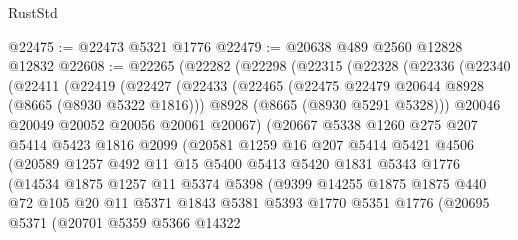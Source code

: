 \begin{lexlean}{RustStd}
\begin{coremodule}
@22475 := @22473 @5321 @1776
@22479 := @20638 @489 @2560 @12828 @12832
@22608 := @22265
    (@22282
      (@22298
        (@22315
          (@22328
            (@22336
              (@22340
                (@22411
                  (@22419
                    (@22427
                      (@22433
                        (@22465
                          (@22475 @22479 @20644 @8928 (@8665 (@8930 @5322 @1816)))
                          @8928
                          (@8665 (@8930 @5291 @5328)))
                        @20046
                        @20049
                        @20052
                        @20056
                        @20061
                        @20067)
                      (@20667
                        @5338
                        @1260
                        @275
                        @207
                        @5414
                        @5423
                        @1816
                        @2099
                        (@20581
                          @1259
                          @16
                          @207
                          @5414
                          @5421
                          @4506
                          (@20589
                            @1257
                            @492
                            @11
                            @15
                            @5400
                            @5413
                            @5420
                            @1831
                            @5343
                            @1776
                            (@14534
                              @1875
                              @1257
                              @11
                              @5374
                              @5398
                              (@9399
                                @14255
                                @1875
                                @1875
                                @440
                                @72
                                @105
                                @20
                                @11
                                @5371
                                @1843
                                @5381
                                @5393
                                @1770
                                @5351
                                @1776
                                (@20695
                                  @5371
                                  (@20701
                                    @5359
                                    @5366
                                    @14322

\end{coremodule}
\end{lexlean}
